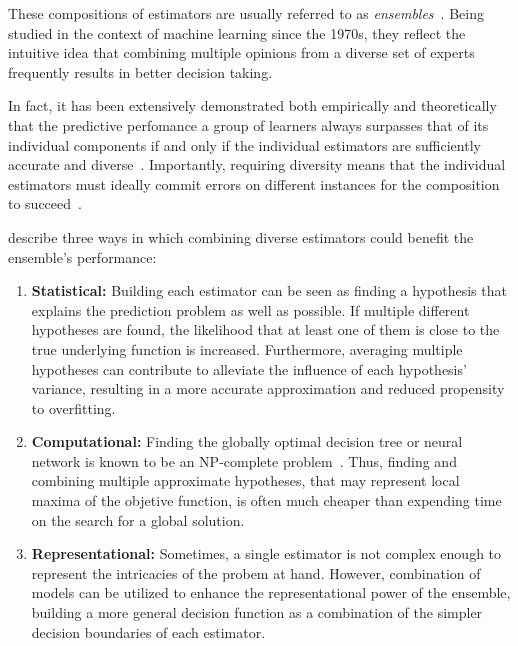 These compositions of estimators are usually referred to as \emph{ensembles}~\cite{dietterich2000ensemble,breiman2001random,polikar2006ensemble}.
Being studied in the context of machine learning since the 1970s, they reflect the intuitive idea that combining multiple opinions from a diverse set of experts frequently results in better decision taking. %


In fact, it has been extensively demonstrated both empirically and theoretically that the predictive perfomance a group of learners always surpasses that of its individual components if and only if the individual estimators are sufficiently accurate and diverse~\cite{dietterich2000ensemble,breiman2001random,polikar2006ensemble,zhou2019deep}. %
Importantly, requiring diversity means that the individual estimators must ideally commit errors on different instances for the composition to succeed~\cite{polikar2006ensemble}.

 describe three ways in which combining diverse estimators could benefit the ensemble's performance:

\begin{enumerate}
    \item \textbf{Statistical:} Building each estimator can be seen as finding a hypothesis that explains the prediction problem as well as possible. If multiple different hypotheses are found, the likelihood that at least one of them is close to the true underlying function is increased. Furthermore, averaging multiple hypotheses can contribute to alleviate the influence of each hypothesis' variance, resulting in a more accurate approximation and reduced propensity to overfitting.
    \item \textbf{Computational:} Finding the globally optimal decision tree or neural network is known to be an NP-complete problem~\cite{hyafil1976constructing}. Thus, finding and combining multiple approximate hypotheses, that may represent local maxima of the objetive function, is often much cheaper than expending time on the search for a global solution. %
    \item \textbf{Representational:} Sometimes, a single estimator is not complex enough to represent the intricacies of the probem at hand. However, combination of models can be utilized to enhance the representational power of the ensemble, building a more general decision function as a combination of the simpler decision boundaries of each estimator.  %
\end{enumerate}

